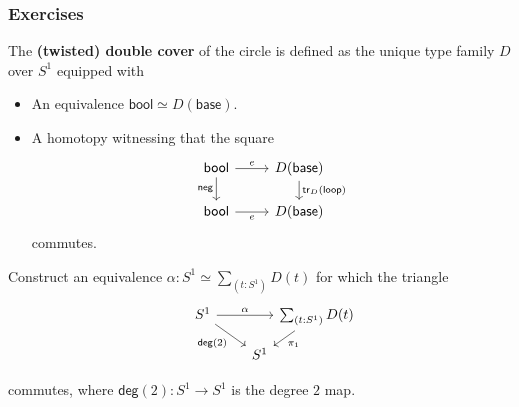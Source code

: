 \documentclass[handout]{beamer}
\newcommand{\sphere}[1]{S^{#1}}
\newcommand{\baseS}{\mathsf{base}}
\newcommand{\loopS}{\mathsf{loop}}
\newcommand{\tr}{\mathsf{tr}}
\newcommand{\bool}{\mathsf{bool}}
\begin{document}
\begin{frame}
  \frametitle{Exercises}
  The \textbf{(twisted) double cover} of the circle is defined as the unique type family $D$ over $\sphere{1}$ equipped with
  \begin{itemize}
  \item An equivalence $\bool\simeq D(\baseS)$.
  \item A homotopy witnessing that the square
    \begin{equation*}
      \begin{tikzcd}[ampersand replacement=\&,row sep=1.4em]
        \bool \arrow[r,"e"] \arrow[d,swap,"\mathsf{neg}"] \& D(\baseS) \arrow[d,"\tr_{D}(\loopS)"] \\
        \bool \arrow[r,swap,"e"] \& D(\baseS)
      \end{tikzcd}
    \end{equation*}
    commutes.
  \end{itemize}
  Construct an equivalence $\alpha:{\sphere{1}}\simeq{\sum_{(t:\sphere{1})}D(t)}$ for which the triangle
  \begin{equation*}
    \begin{tikzcd}[column sep=0em,ampersand replacement=\&,row sep=small]
      \sphere{1} \arrow[rr,"\alpha"] \arrow[dr,swap,"\mathsf{deg}(2)"] \& \& \sum_{(t:\sphere{1})}D(t) \arrow[dl,"\pi_1"] \\
      \phantom{\sum_{(t:\sphere{1})}D(t)} \& \sphere{1}
    \end{tikzcd}
  \end{equation*}
  commutes, where $\mathsf{deg}(2):\sphere{1}\to\sphere{1}$ is the degree $2$ map.
\end{frame}
\end{document}
